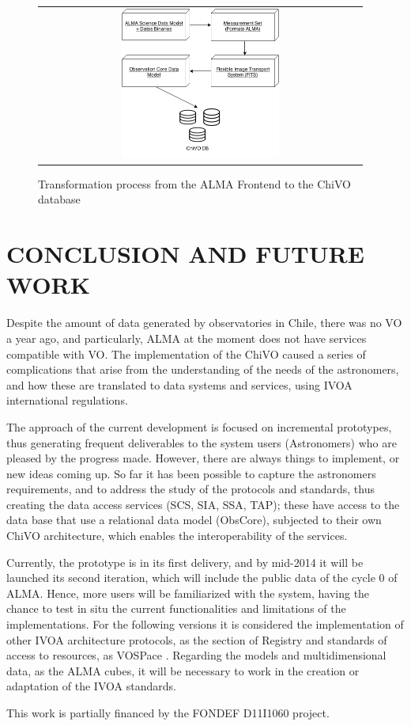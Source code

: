 \documentclass[]{spie}
\begin{document}
\begin{figure}
   \begin{center}
   \begin{tabular}{c}
   \includegraphics[width=0.5\textwidth]{images/metadata.png}
   \end{tabular}
   \end{center}
   \caption[example]
   {\label{fig:metadata} Transformation process from the ALMA Frontend to the ChiVO database}
\end{figure}

\section{CONCLUSION AND FUTURE WORK}
Despite the amount of data generated by observatories in Chile, there was no VO a year ago, and particularly, ALMA at the moment does not have services compatible with VO. The implementation of the ChiVO caused a series of complications that arise from the understanding of the needs of the astronomers, and how these are translated to data systems and services, using IVOA international regulations.

The approach of the current development is focused on incremental prototypes, thus generating frequent deliverables to the system users (Astronomers) who are pleased by the progress made. However, there are always things to implement, or new ideas coming up. So far it has been possible to capture the astronomers requirements, and to address the study of the protocols and standards, thus creating the data access services (SCS, SIA, SSA, TAP); these have access to the data base that use a relational data model (ObsCore), subjected to their own ChiVO architecture, which enables the interoperability of the services.

Currently, the prototype is in its first delivery, and by mid-2014 it will be launched its second iteration, which will include the public data of the cycle 0 of ALMA. Hence, more users will be familiarized with the system, having the chance to test in situ the current functionalities and limitations of the implementations.  For the following versions it is considered the implementation of other IVOA architecture protocols, as the section of Registry and standards of access to resources, as VOSPace \cite{graham2007vospace}.  Regarding the models and multidimensional data, as the ALMA cubes, it will be necessary to work in the creation or adaptation of the IVOA standards.

\acknowledgments     %
This work is partially financed by the FONDEF D11I1060 project.
\newpage
\end{document}

